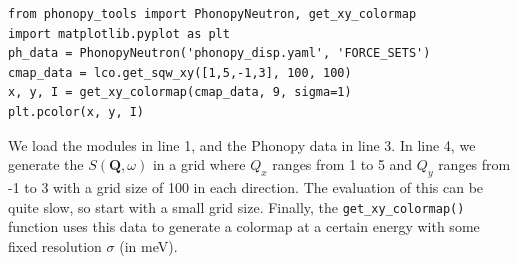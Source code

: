 \vspace{1em}
\begin{lstlisting}
from phonopy_tools import PhonopyNeutron, get_xy_colormap
import matplotlib.pyplot as plt
ph_data = PhonopyNeutron('phonopy_disp.yaml', 'FORCE_SETS')
cmap_data = lco.get_sqw_xy([1,5,-1,3], 100, 100)
x, y, I = get_xy_colormap(cmap_data, 9, sigma=1)
plt.pcolor(x, y, I)
\end{lstlisting}
\vspace{1em}

\noindent We load the modules in line 1, and the Phonopy data in line 3. In line 4, we generate the $S(\bm{Q},\omega)$ in a grid where $Q_x$ ranges from 1 to 5 and $Q_y$ ranges from -1 to 3 with a grid size of 100 in each direction. The evaluation of this can be quite slow, so start with a small grid size. Finally, the \texttt{get\_xy\_colormap()} function uses this data to generate a colormap at a certain energy with some fixed resolution $\sigma$ (in meV).







